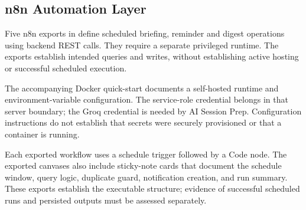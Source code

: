 \documentclass[12pt,a4paper,openany]{report}
\begin{document}
\subsection{n8n Automation Layer}

Five n8n exports in  define scheduled briefing, reminder and digest operations using backend REST calls. They require a separate privileged runtime. The exports establish intended queries and writes, without establishing active hosting or successful scheduled execution.


The accompanying Docker quick-start documents a self-hosted runtime and environment-variable configuration. The service-role credential belongs in that server boundary; the Groq credential is needed by AI Session Prep. Configuration instructions do not establish that secrets were securely provisioned or that a container is running.


Each exported workflow uses a schedule trigger followed by a Code node. The exported canvases also include sticky-note cards that document the schedule window, query logic, duplicate guard, notification creation, and run summary. These exports establish the executable structure; evidence of successful scheduled runs and persisted outputs must be assessed separately.
\end{document}
